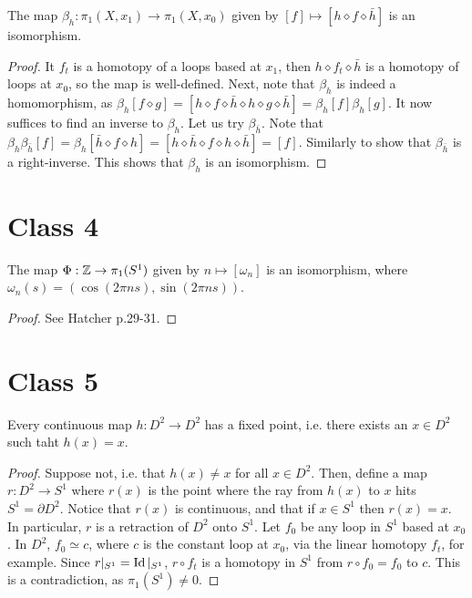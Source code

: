 \documentclass{../mathnotes}
\begin{document}
\begin{prop}
    The map $\beta_h:\pi_1(X,x_1)\to\pi_1(X,x_0)$ given by $[f]\mapsto[h\diamond f\diamond \bar h]$
    is an isomorphism.
\end{prop}
\begin{proof}
    It $f_t$ is a homotopy of a loops based at $x_1$, then $h\diamond f_t\diamond\bar h$ is a homotopy
    of loops at $x_0$, so the map is well-defined. Next, note that $\beta_h$ is indeed a homomorphism,
    as $\beta_h[f\diamond g]=[h\diamond f\diamond \bar h\diamond h\diamond g\diamond \bar h]=\beta_h[f]\beta_h[g]$.
    It now suffices to find an inverse to $\beta_h$. Let us try $\beta_{\bar h}$. Note that
    $\beta_h\beta_{\bar h}[f]=\beta_h[\bar h\diamond f\diamond h]=[h\diamond\bar h\diamond f\diamond h\diamond\bar h]=[f]$.
    Similarly to show that $\beta_{\bar h}$ is a right-inverse. This shows that $\beta_h$ is an isomorphism.
\end{proof}

\section*{Class 4}

\begin{thm}
    The map $\Phi:\mathbb{Z}\to\pi_1(S^1)$ given by $n\mapsto [\omega_n]$ is an isomorphism, where
    $\omega_n(s)=\left( \cos(2\pi ns),\sin(2\pi ns) \right)$.
\end{thm}
\begin{proof}
    See Hatcher p.29-31.
\end{proof}

\section*{Class 5}

\begin{thm}
     Every continuous map $h:D^2\to D^2$ has a fixed point, i.e. there exists an $x\in D^2$ such taht 
     $h(x)=x$.
\end{thm}
\begin{proof}
    Suppose not, i.e. that $h(x)\neq x$ for all $x\in D^2$. Then, define a map $r:D^2\to S^1$ where
    $r(x)$ is the point where the ray from $h(x)$ to $x$ hits $S^1=\partial D^2$. Notice that $r(x)$
    is continuous, and that if $x\in S^1$ then $r(x)=x$. In particular, $r$ is a retraction of $D^2$
    onto $S^1$. Let $f_0$ be any loop in $S^1$ based at $x_0$. In $D^2$, $f_0\simeq c$, where $c$ is
    the constant loop at $x_0$, via the linear homotopy $f_t$, for example. Since $r|_{S^1}=\operatorname{Id}|_{S^1}$,
    $r\circ f_t$ is a homotopy in $S^1$ from $r\circ f_0=f_0$ to $c$. This is a contradiction, as
    $\pi_1(S^1)\neq 0$.
\end{proof}
\end{document}
